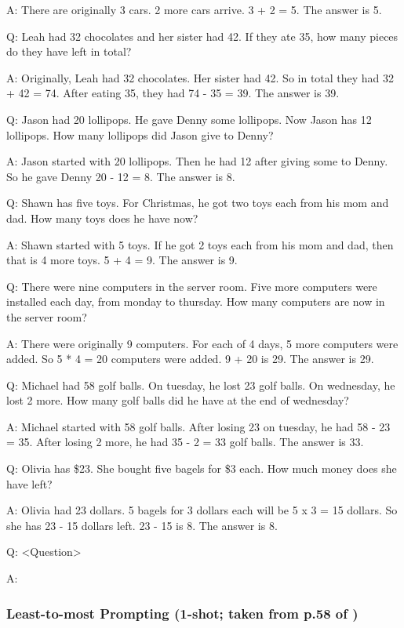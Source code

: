 \documentclass[11pt]{article}
\begin{document}
A: There are originally 3 cars. 2 more cars arrive. 3 + 2 = 5. The answer is 5.

Q: Leah had 32 chocolates and her sister had 42. If they ate 35, how many pieces do they have left in total?

A: Originally, Leah had 32 chocolates. Her sister had 42. So in total they had 32 + 42 = 74. After eating 35, they had 74 - 35 = 39. The answer is 39.

Q: Jason had 20 lollipops. He gave Denny some lollipops. Now Jason has 12 lollipops. How many lollipops did Jason give to Denny?

A: Jason started with 20 lollipops. Then he had 12 after giving some to Denny. So he gave Denny 20 - 12 = 8. The answer is 8.

Q: Shawn has five toys. For Christmas, he got two toys each from his mom and dad. How many toys does he have now?

A: Shawn started with 5 toys. If he got 2 toys each from his mom and dad, then that is 4 more toys. 5 + 4 = 9. The answer is 9.

Q: There were nine computers in the server room. Five more computers were installed each day, from monday to thursday. How many computers are now in the server room?

A: There were originally 9 computers. For each of 4 days, 5 more computers were added. So 5 * 4 = 20 computers were added. 9 + 20 is 29. The answer is 29.

Q: Michael had 58 golf balls. On tuesday, he lost 23 golf balls. On wednesday, he lost 2 more. How many golf balls did he have at the end of wednesday?

A: Michael started with 58 golf balls. After losing 23 on tuesday, he had 58 - 23 = 35. After losing 2 more, he had 35 - 2 = 33 golf balls. The answer is 33.

Q: Olivia has \$23. She bought five bagels for \$3 each. How much money does she have left?

A: Olivia had 23 dollars. 5 bagels for 3 dollars each will be 5 x 3 = 15 dollars. So she has 23 - 15 dollars left. 23 - 15 is 8. The answer is 8.

Q: <Question>

A:

\subsubsection*{Least-to-most Prompting (1-shot; taken from p.58 of \citealp{zhou_least--most_2023})}
\end{document}
